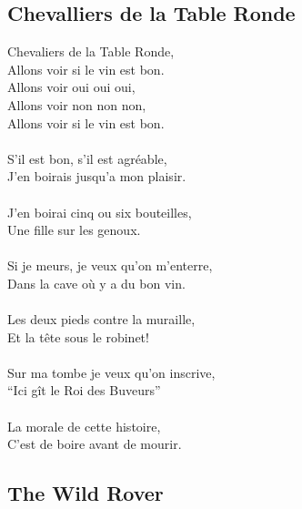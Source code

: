 \documentclass[a5paper]{article}
\begin{document}
\newpage

\subsection{Chevalliers de la Table Ronde} %
\label{sub:chevalliers_de_la_table_ronde}

Chevaliers de la Table Ronde,       \\
Allons voir si le vin est bon.            \\
Allons voir oui oui oui,                   \\
Allons voir non non non, 	            \\
Allons voir si le vin est bon.          \\
\\
S'il est bon, s'il est agr\'{e}able,\\
J'en boirais jusqu'a mon plaisir.\\
\\
J'en boirai cinq ou six bouteilles,\\
Une fille sur les genoux.\\
\\
Si je meurs, je veux qu'on m'enterre,\\
Dans la cave o\`{u} y a du bon vin.\\
\\
Les deux pieds contre la muraille,\\
Et la t\^{e}te sous le robinet!\\
\\
Sur ma tombe je veux qu'on inscrive,\\
``Ici g\^{i}t le Roi des Buveurs''\\
\\
La morale de cette histoire,\\
C'est de boire avant de mourir.  \\


\newpage
\subsection{The Wild Rover} %
\label{sub:the_wild_rover}
\end{document}
